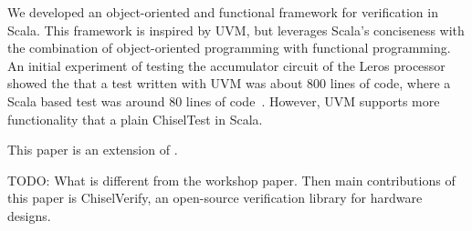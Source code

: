 \documentclass[runningheads]{llncs}
\newcommand{\todo}[1]{{\color{olive} TODO: #1}}
\begin{document}

We developed an object-oriented and functional framework for verification in Scala.
This framework is inspired by UVM, but leverages Scala's conciseness with the
combination of object-oriented programming with functional programming.
An initial experiment of testing the accumulator circuit of the Leros processor~\cite{leros:arcs2019}
showed the that a test written with UVM was about 800 lines of code, where a Scala based
test was around 80 lines of code~\cite{verify:chisel:2020}.
However, UVM supports more functionality that a plain ChiselTest in Scala.

%
%
%


This paper is an extension of \cite{verify:chisel:2020}.

\todo{What is different from the workshop paper}. Then main contributions of
this paper is ChiselVerify, an open-source verification library for hardware designs.
\end{document}
